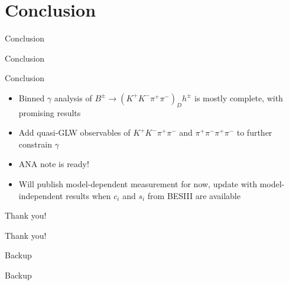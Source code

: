 \documentclass{beamer}
\begin{document}
\section{Conclusion}
\begin{frame}{Conclusion}
  \begin{center}
    {\huge Conclusion}
  \end{center}
\end{frame}

\begin{frame}{Conclusion}
  \begin{itemize}
    \setlength\itemsep{2em}
    \item{Binned $\gamma$ analysis of $B^\pm\to(K^+K^-\pi^+\pi^-)_Dh^\pm$ is mostly complete, with promising results}
    \item{Add quasi-GLW observables of $K^+K^-\pi^+\pi^-$ and $\pi^+\pi^-\pi^+\pi^-$ to further constrain $\gamma$}
    \item{ANA note is ready!}
    \item{Will publish model-dependent measurement for now, update with model-independent results when $c_i$ and $s_i$ from BESIII are available}
  \end{itemize}
\end{frame}

\begin{frame}{Thank you!}
  \begin{center}
    {\huge Thank you!}
  \end{center}
\end{frame}

\begin{frame}{Backup}
  \begin{center}
    {\huge Backup}
  \end{center}
\end{frame}
\end{document}
